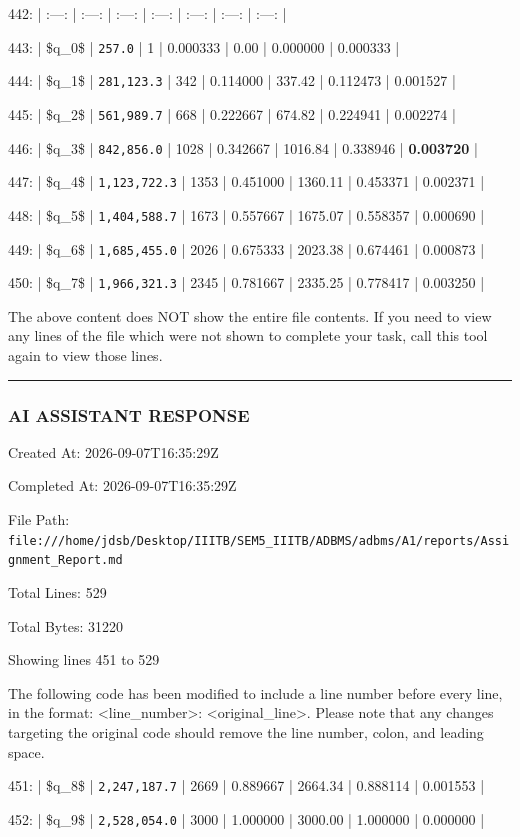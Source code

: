 \documentclass[11pt,a4paper]{article}
\begin{document}
442: | :---: | :---: | :---: | :---: | :---: | :---: | :---: |

443: | \$q\_0\$ | \texttt{257.0} | 1 | 0.000333 | 0.00 | 0.000000 | 0.000333 |

444: | \$q\_1\$ | \texttt{281,123.3} | 342 | 0.114000 | 337.42 | 0.112473 | 0.001527 |

445: | \$q\_2\$ | \texttt{561,989.7} | 668 | 0.222667 | 674.82 | 0.224941 | 0.002274 |

446: | \$q\_3\$ | \texttt{842,856.0} | 1028 | 0.342667 | 1016.84 | 0.338946 | \textbf{0.003720} |

447: | \$q\_4\$ | \texttt{1,123,722.3} | 1353 | 0.451000 | 1360.11 | 0.453371 | 0.002371 |

448: | \$q\_5\$ | \texttt{1,404,588.7} | 1673 | 0.557667 | 1675.07 | 0.558357 | 0.000690 |

449: | \$q\_6\$ | \texttt{1,685,455.0} | 2026 | 0.675333 | 2023.38 | 0.674461 | 0.000873 |

450: | \$q\_7\$ | \texttt{1,966,321.3} | 2345 | 0.781667 | 2335.25 | 0.778417 | 0.003250 |

The above content does NOT show the entire file contents. If you need to view any lines of the file which were not shown to complete your task, call this tool again to view those lines.


\hrule

\subsubsection{AI ASSISTANT RESPONSE}

Created At: 2026-09-07T16:35:29Z

Completed At: 2026-09-07T16:35:29Z

File Path: \texttt{file:///home/jdsb/Desktop/IIITB/SEM5\_IIITB/ADBMS/adbms/A1/reports/Assignment\_Report.md}

Total Lines: 529

Total Bytes: 31220

Showing lines 451 to 529

The following code has been modified to include a line number before every line, in the format: <line\_number>: <original\_line>. Please note that any changes targeting the original code should remove the line number, colon, and leading space.

451: | \$q\_8\$ | \texttt{2,247,187.7} | 2669 | 0.889667 | 2664.34 | 0.888114 | 0.001553 |

452: | \$q\_9\$ | \texttt{2,528,054.0} | 3000 | 1.000000 | 3000.00 | 1.000000 | 0.000000 |
\end{document}
